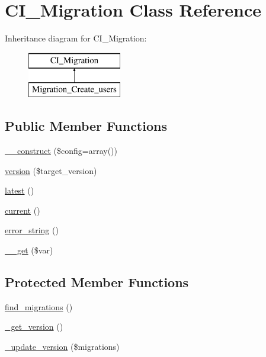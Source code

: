 \hypertarget{class_c_i___migration}{\section{C\-I\-\_\-\-Migration Class Reference}
\label{class_c_i___migration}
}
Inheritance diagram for C\-I\-\_\-\-Migration\-:\begin{figure}[H]
\begin{center}
\leavevmode
\includegraphics[height=2.000000cm]{class_c_i___migration}
\end{center}
\end{figure}
\subsection*{Public Member Functions}
\begin{DoxyCompactItemize}
\item 
\hyperlink{class_c_i___migration_af7f9493844d2d66e924e3c1df51ce616}{\-\_\-\-\_\-construct} (\$config=array())
\item 
\hyperlink{class_c_i___migration_a9192bce789e541754ba481dfec6bb39a}{version} (\$target\-\_\-version)
\item 
\hyperlink{class_c_i___migration_a23502a9f08bfc74caf3914113d11db2b}{latest} ()
\item 
\hyperlink{class_c_i___migration_af343507d1926e6ecf964625d41db528c}{current} ()
\item 
\hyperlink{class_c_i___migration_aad434fa9bec99e30d6a86beb5c2607df}{error\-\_\-string} ()
\item 
\hyperlink{class_c_i___migration_a8fb2d9cdca17b87400e780b9f9720933}{\-\_\-\-\_\-get} (\$var)
\end{DoxyCompactItemize}
\subsection*{Protected Member Functions}
\begin{DoxyCompactItemize}
\item 
\hyperlink{class_c_i___migration_a6581e916a05e39e46c09fe9878b2d93a}{find\-\_\-migrations} ()
\item 
\hyperlink{class_c_i___migration_a1de42592aaef750bc3782e873b1b6d5f}{\-\_\-get\-\_\-version} ()
\item 
\hyperlink{class_c_i___migration_a1247aace04c0d103e56b7066f5212eb3}{\-\_\-update\-\_\-version} (\$migrations)
\end{DoxyCompactItemize}
